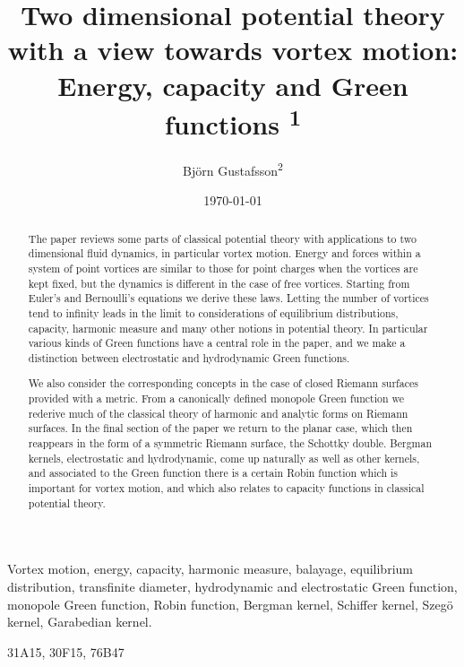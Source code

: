 \documentclass[reqno,12pt]{article}
\theoremstyle{plain}
\theoremstyle{definition}
\numberwithin{equation}{section}
\numberwithin{figure}{section}
\begin{document}
\title{Two dimensional potential theory \\with a view towards vortex motion:\\
Energy, capacity and Green functions
\textsuperscript{1}}
\author{
Bj\"orn Gustafsson\textsuperscript{2}
}
 
\date{\today}

\maketitle

\tableofcontents

\begin{abstract} 
The paper reviews some parts of classical potential theory with applications to two dimensional fluid dynamics, in particular vortex motion. 
Energy and forces within a system of point vortices are similar to those for point charges when the vortices are kept fixed, but the dynamics 
is different in the case of free vortices. Starting from Euler's and Bernoulli's equations we derive these laws. Letting the number of vortices tend to infinity 
leads in the limit to considerations of equilibrium distributions, capacity, harmonic measure and many other notions in potential theory. In particular various kinds of Green functions have a central role in the paper, and we make a distinction between electrostatic and hydrodynamic Green functions.

We also consider the corresponding concepts in the case of closed Riemann surfaces provided with a metric. From a canonically defined 
monopole Green function we rederive much of the classical theory of harmonic and analytic forms on Riemann surfaces. In the final section 
of the paper we return to the planar case, which then reappears in the form of a symmetric Riemann surface, the Schottky double. Bergman kernels, 
electrostatic  and hydrodynamic, come up naturally as well as other kernels, 
and associated to the Green function there is a certain Robin function which is important for vortex 
motion, and which also relates to capacity functions in classical potential theory.
\end{abstract}

 Vortex motion, energy, capacity, harmonic measure, balayage, 
equilibrium distribution, transfinite diameter,
hydrodynamic and electrostatic Green function, monopole Green function, Robin function, 
Bergman kernel, Schiffer kernel, Szeg\"o kernel, Garabedian kernel.

 31A15, 30F15, 76B47
\end{document}
